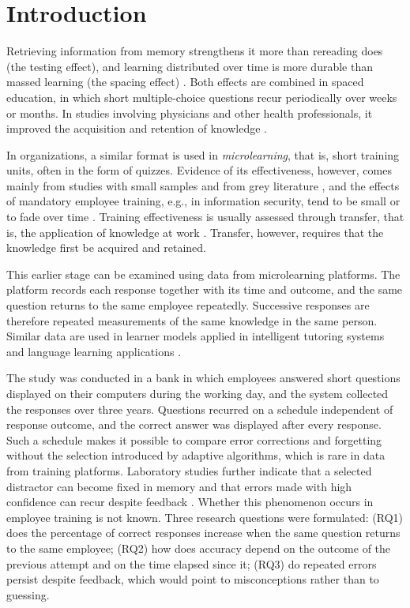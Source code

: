 \section{Introduction}

Retrieving information from memory strengthens it more than rereading does (the testing effect), and
learning distributed over time is more durable than massed learning (the spacing effect)
\citep{roediger2006,cepeda2006}. Both effects are combined in spaced education, in which short
multiple-choice questions recur periodically over weeks or months. In studies involving physicians and
other health professionals, it improved the acquisition and retention of knowledge
\citep{kerfoot2009,phillips2019}.

In organizations, a similar format is used in \emph{microlearning}, that is, short training units,
often in the form of quizzes. Evidence of its effectiveness, however, comes mainly from studies with
small samples and from grey literature \citep{taylor2022}, and the effects of mandatory employee
training, e.g., in information security, tend to be small or to fade over time
\citep{reinheimer2020}. Training effectiveness is usually assessed through transfer, that is, the
application of knowledge at work \citep{blume2010}. Transfer, however, requires that the knowledge
first be acquired and retained.

This earlier stage can be examined using data from microlearning platforms. The platform records each
response together with its time and outcome, and the same question returns to the same employee
repeatedly. Successive responses are therefore repeated measurements of the same knowledge in the same
person. Similar data are used in learner models applied in intelligent tutoring systems and language
learning applications \citep{corbett1994,settles2016}.

The study was conducted in a bank in which employees answered short questions displayed on their
computers during the working day, and the system collected the responses over three years. Questions
recurred on a schedule independent of response outcome, and the correct answer was displayed after
every response. Such a schedule makes it possible to compare error corrections and forgetting without
the selection introduced by adaptive algorithms, which is rare in data from training platforms.
Laboratory studies further indicate that a selected distractor can become fixed in memory and that
errors made with high confidence can recur despite feedback \citep{butler2008,butler2011}. Whether this
phenomenon occurs in employee training is not known. Three research questions were formulated:
(RQ1) does the percentage of correct responses increase when the same question returns to the same
employee;
(RQ2) how does accuracy depend on the outcome of the previous attempt and on the time elapsed since it;
(RQ3) do repeated errors persist despite feedback, which would point to misconceptions rather than to
guessing.
